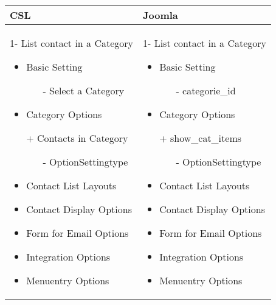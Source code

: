 \begin{minipage}{0.7\textwidth}
\begin{tabular}{|p{} | p{}|}
\hline
\textbf{CSL} & \textbf{Joomla} \\ 
\hline
 1- List contact in a Category
   \begin{itemize}
     \item Basic  Setting 
    		\begin{enumerate}
    			\item[-] Select a Category
    		\end{enumerate}
    	\item Category Options
    	\item[+] Contacts in Category 
    		   \begin{enumerate}
    		    	 \item[-] OptionSettingtype
    		    \end{enumerate}
    \item Contact List Layouts
 	\item Contact Display Options
 	\item Form for Email Options
 	\item Integration Options
 	\item Menuentry Options
  \end{itemize}
 & 
1- List contact in a Category
  \begin{itemize}
    \item Basic  Setting 
   		\begin{enumerate}
   			\item[-] categorie\_id
   		\end{enumerate}
   	\item Category Options
   	\item[+] show\_cat\_items
   		    	  \begin{enumerate}
   		    			 \item[-] OptionSettingtype
   		    	\end{enumerate}
   	\item Contact List Layouts
	\item Contact Display Options
	\item Form for Email Options
	\item Integration Options
	\item Menuentry Options
 \end{itemize}
\\
\hline
\end{tabular}
\end{minipage}

